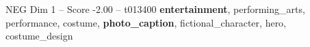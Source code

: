 \begin{textsample}{NEG Dim 1 – Score -2.00 – t013400}  \label{ex:f1_neg_022}
\textbf{entertainment}, performing\_arts, performance, costume, \textbf{photo\_caption}, fictional\_character, hero, costume\_design

\end{textsample}
